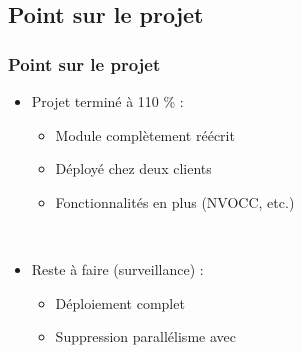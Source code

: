 \subsection{Point sur le projet}

\begin{frame}
	\frametitle{Point sur le projet}
	
	\begin{itemize}
		\item Projet terminé à 110 \% :
			\begin{itemize}
				\item Module complètement réécrit
				\item Déployé chez deux clients\sautligne
				
				\item Fonctionnalités en plus (NVOCC, etc.)
			\end{itemize}~
			
		\item Reste à faire (surveillance) :
			\begin{itemize}
				\item Déploiement complet
				\item Suppression parallélisme avec 
			\end{itemize}
	\end{itemize}
\end{frame}
